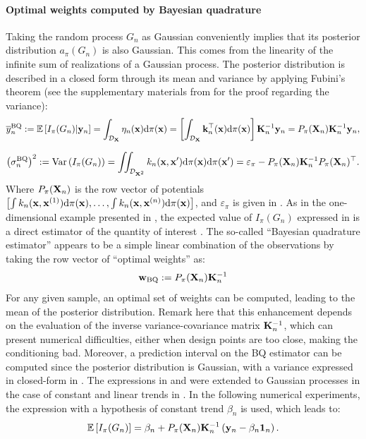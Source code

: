 \paragraph{Optimal weights computed by Bayesian quadrature}%
Taking the random process $G_n$ as Gaussian conveniently implies that its posterior distribution $a_\pi(G_n)$ is also Gaussian. 
This comes from the linearity of the infinite sum of realizations of a Gaussian process. 
The posterior distribution is described in a closed form through its mean and variance by applying Fubini's theorem (see the supplementary materials from \cite{briol_oates_2019} for the proof regarding the variance): 
\begin{equation}
     \overline{y}_n^{\mathrm{BQ}} := \mathbb{E}\left[I_{\pi}(G_n) | {\bf y}_n \right] 
     = \int_{\mathcal{D}_{\bf X}} \eta_n({\bf x}) \mathrm{d} \pi({\bf x})
     = \left[\int_{\mathcal{D}_{\bf X}} {\bf k}_n^\top({\bf x}) \mathrm{d} \pi({\bf x}) \right] {\bf K}_n^{-1} {\bf y}_n
     = P_\pi({\bf X}_n) {\bf K}_n^{-1} {\bf y}_n,       
\label{eq:mean_post}
\end{equation}

\begin{equation}
    \left(\sigma_n^{\mathrm{BQ}}\right)^2 := \operatorname{Var}\left(I_{\pi}(G_n) \right) 
    = \iint_{\mathcal{D}_{{\bf X}^2}} k_n({\bf x}, {\bf x}') \mathrm{d} \pi({\bf x}) \mathrm{d} \pi({\bf x}') 
    = \varepsilon_\pi - P_\pi({\bf X}_n) {\bf K}_n^{-1} P_\pi({\bf X}_n)^\top.
\label{eq:var_post}
\end{equation}
\noindent
Where $P_\pi({\bf X}_n)$ is the row vector of potentials $\left[\int k_n({\bf x}, {\bf x}^{(1)}) \mathrm{d} \pi({\bf x}), \dots, \int k_n({\bf x}, {\bf x}^{(n)}) \mathrm{d} \pi({\bf x})\right]$, and $\varepsilon_\pi$ is given in . 
As in the one-dimensional example presented in , the expected value of $I_{\pi}(G_n)$ expressed in  is a direct estimator of the quantity of interest . 
The so-called ``Bayesian quadrature estimator'' appears to be a simple linear combination of the observations by taking the row vector of ``optimal weights'' as: 
\begin{equation}
    \mathbf{w}_{\mathrm{BQ}} := P_\pi({\bf X}_n) {\bf K}_n^{-1}
    \label{eq:bq_weights}
\end{equation}
For any given sample, an optimal set of weights can be computed, leading to the mean of the posterior distribution. 
Remark here that this enhancement depends on the evaluation of the inverse variance-covariance matrix ${\bf K}_n^{-1}$, which can present numerical difficulties, either when design points are too close, making the conditioning bad. 
Moreover, a prediction interval on the BQ estimator can be computed since the posterior distribution is Gaussian, with a variance expressed in closed-form in . 
The expressions in  and  were extended to Gaussian processes in the case of constant and linear trends in \cite{pronzato_zhigljavsky_2020}. 
In the following numerical experiments, the expression with a hypothesis of constant trend $\beta_n$ is used, which leads to:
\begin{equation}
     \mathbb{E}\left[I_{\pi}(G_n)\right] = \beta_n + P_\pi({\bf X}_n) {\bf K}_n^{-1} \left({\bf y}_n - \beta_n \mathbf{1}_n \right).
     \label{eq:mean_post_cst}
\end{equation}


